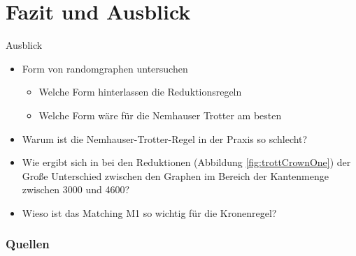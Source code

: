 \documentclass{beamer}
\begin{document}
\section{Fazit und Ausblick}
\begin{frame}{Ausblick}
\begin{itemize}
\item Form von randomgraphen untersuchen
	\begin{itemize}
	\item Welche Form hinterlassen die Reduktionsregeln
	\item Welche Form wäre für die Nemhauser Trotter am besten
	\end{itemize}
\item Warum ist die Nemhauser-Trotter-Regel in der Praxis so schlecht?
\item Wie ergibt sich in bei den Reduktionen (Abbildung \ref{fig:trottCrownOne}) der Große Unterschied zwischen den Graphen im Bereich der Kantenmenge zwischen 3000 und 4600?
\item Wieso ist das Matching M1 so wichtig für die Kronenregel?
\end{itemize}
\end{frame}
  \begin{frame}[allowframebreaks]
        \frametitle{Quellen}

        
\end{frame}
\end{document}
